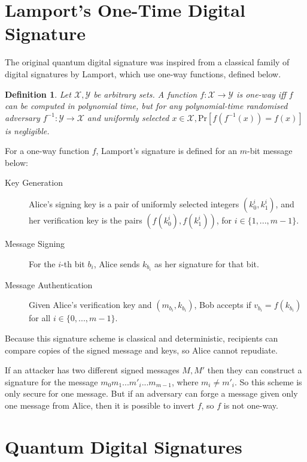 \documentclass[%
 reprint,
 amsmath,amssymb,
 aps,
 pra,
]{revtex4-1}
\newtheorem{definition}{Definition}[section]
\begin{document}
\section{Lamport's One-Time Digital Signature}
\label{sec:lamport}

The original quantum digital signature was inspired from a classical family of digital signatures by Lamport\cite{lamp79}, which use one-way functions, defined below.

\begin{definition}
Let $\mathcal{X}, \mathcal{Y}$ be arbitrary sets. A function $f:\mathcal{X} \rightarrow \mathcal{Y}$ is one-way iff $f$ can be computed in polynomial time, but for any polynomial-time randomised adversary $f^{-1}:\mathcal{Y} \rightarrow \mathcal{X}$ and uniformly selected $x \in \mathcal{X}, \mathrm{Pr}[f(f^{-1}(x)) = f(x)]$ is negligible.
\end{definition}

For a one-way function $f$, Lamport's signature is defined for an $m$-bit message below:

\begin{description}
\item[Key Generation]Alice's signing key is a pair of uniformly selected integers $(k^i_0, k^i_1)$, and her verification key is the pairs $(f(k^i_0), f(k^i_1))$, for $i \in \{1,...,m-1\}$.
\item[Message Signing]For the $i$-th bit $b_i$, Alice sends $k_{b_i}$ as her signature for that bit.
\item[Message Authentication]Given Alice's verification key and $(m_{b_i}, k_{b_i})$, Bob accepts if $v_{b_i} = f(k_{b_i})$ for all $i \in \{0,...,m-1\}$.
\end{description}

Because this signature scheme is classical and deterministic, recipients can compare copies of the signed message and keys, so Alice cannot repudiate.

If an attacker has two different signed messages $M, M'$ then they can construct a signature for the message $m_0m_1...m'_i...m_{m-1}$, where $m_i \neq m'_i$. So this scheme is only secure for one message. But if an adversary can forge a message given only one message from Alice, then it is possible to invert $f$, so $f$ is not one-way.

\section{Quantum Digital Signatures}
\label{sec:qds}
\end{document}
